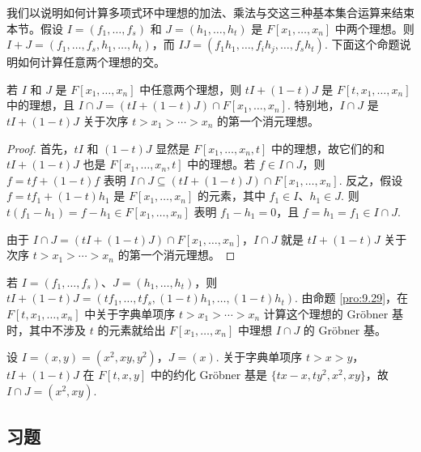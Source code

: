我们以说明如何计算多项式环中理想的加法、乘法与交这三种基本集合运算来结束本节。假设 \(I = (f_1, \ldots, f_s)\) 和 \(J = (h_1, \ldots, h_t)\) 是 \(F[x_1, \ldots, x_n]\) 中两个理想。则 \(I+J = (f_1, \ldots, f_s, h_1, \ldots, h_t)\)，而 \(IJ = (f_1h_1, \ldots, f_ih_j, \ldots, f_sh_t)\). 下面这个命题说明如何计算任意两个理想的交。

\begin{proposition}\label{pro:9.30}
若 \(I\) 和 \(J\) 是 \(F[x_1, \ldots, x_n]\) 中任意两个理想，则 \(tI+(1-t)J\) 是 \(F[t, x_1, \ldots, x_n]\) 中的理想，且 \(I \cap J = (tI+(1-t)J) \cap F[x_1, \ldots, x_n]\). 特别地，\(I \cap J\) 是 \(tI+(1-t)J\) 关于次序 \(t > x_1 > \cdots > x_n\) 的第一个消元理想。
\end{proposition}

\begin{proof}
首先，\(tI\) 和 \((1-t)J\) 显然是 \(F[x_1, \ldots, x_n, t]\) 中的理想，故它们的和 \(tI+(1-t)J\) 也是 \(F[x_1, \ldots, x_n, t]\) 中的理想。若 \(f \in I \cap J\)，则 \(f = tf+(1-t)f\) 表明 \(I \cap J \subseteq (tI+(1-t)J) \cap F[x_1, \ldots, x_n]\). 反之，假设 \(f = tf_1+(1-t)h_1\) 是 \(F[x_1, \ldots, x_n]\) 的元素，其中 \(f_1 \in I\)、\(h_1 \in J\). 则 \(t(f_1-h_1) = f-h_1 \in F[x_1, \ldots, x_n]\) 表明 \(f_1-h_1 = 0\)，且 \(f = h_1 = f_1 \in I \cap J\).

由于 \(I \cap J = (tI+(1-t)J) \cap F[x_1, \ldots, x_n]\)，\(I \cap J\) 就是 \(tI+(1-t)J\) 关于次序 \(t > x_1 > \cdots > x_n\) 的第一个消元理想。
\end{proof}

若 \(I = (f_1, \ldots, f_s)\)、\(J = (h_1, \ldots, h_t)\)，则 \(tI+(1-t)J = (tf_1, \ldots, tf_s, (1-t)h_1, \ldots, (1-t)h_t)\). 由命题 \ref{pro:9.29}，在 \(F[t, x_1, \ldots, x_n]\) 中关于字典单项序 \(t > x_1 > \cdots > x_n\) 计算这个理想的 Gröbner 基时，其中不涉及 \(t\) 的元素就给出 \(F[x_1, \ldots, x_n]\) 中理想 \(I \cap J\) 的 Gröbner 基。

\begin{example}
设 \(I = (x, y) = (x^2, xy, y^2)\)，\(J = (x)\). 关于字典单项序 \(t > x > y\)，\(tI+(1-t)J\) 在 \(F[t, x, y]\) 中的约化 Gröbner 基是 \(\{tx-x, ty^2, x^2, xy\}\)，故 \(I \cap J = (x^2, xy)\).
\end{example}

\subsection*{习题}

